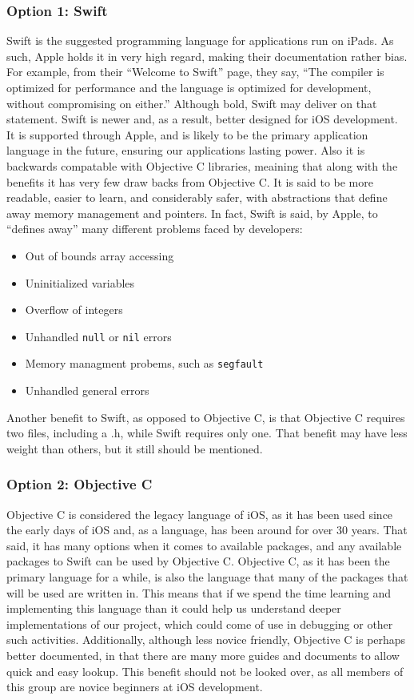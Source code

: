 \documentclass[onecolumn, draftclsnofoot,10pt, compsoc]{IEEEtran}
\begin{document}
\subsubsection{Option 1: Swift}
Swift is the suggested programming language for applications run on iPads.
As such, Apple holds it in very high regard, making their documentation rather bias.
For example, from their ``Welcome to Swift'' page, they say, ``The compiler is optimized for performance and the language is optimized for development, without compromising on either\cite{swift1}.''
Although bold, Swift may deliver on that statement.
Swift is newer and, as a result, better designed for iOS development.
It is supported through Apple, and is likely to be the primary application language in the future, ensuring our applications lasting power.
Also it is backwards compatable with Objective C libraries, meaining that along with the benefits it has very few draw backs from Objective C.
It is said to be more readable, easier to learn, and considerably safer, with abstractions that define away memory management and pointers.
In fact, Swift is said, by Apple, to ``defines away'' many different problems faced by developers:
\begin{itemize}
	\item  Out of bounds array accessing
	\item  Uninitialized variables
	\item  Overflow of integers
	\item  Unhandled \lstinline|null| or \lstinline|nil| errors
	\item  Memory managment probems, such as \lstinline|segfault|
	\item  Unhandled general errors
\end{itemize}
Another benefit to Swift, as opposed to Objective C, is that Objective C requires two files, including a .h, while Swift requires only one.
That benefit may have less weight than others, but it still should be mentioned.

\subsubsection{Option 2: Objective C}
Objective C is considered the legacy language of iOS, as it has been used since the early days of iOS and, as a language, has been around for over 30 years.
That said, it has many options when it comes to available packages, and any available packages to Swift can be used by Objective C.
Objective C, as it has been the primary language for a while, is also the language that many of the packages that will be used are written in.
This means that if we spend the time learning and implementing this language than it could help us understand deeper implementations of our project, which could come of use in debugging or other such activities.
Additionally, although less novice friendly, Objective C is perhaps better documented, in that there are many more guides and documents to allow quick and easy lookup.
This benefit should not be looked over, as all members of this group are novice beginners at iOS development.
\end{document}
